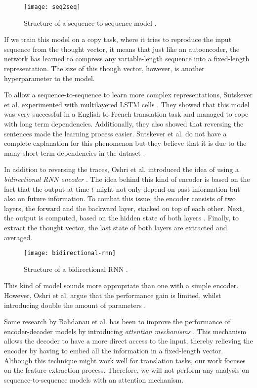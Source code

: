 \begin{figure}[ht]
  \centering
  \texttt{[image: seq2seq]}
  \caption{Structure of a sequence-to-sequence model \cite{britz_2016_1}.}
  \label{fig:seq2seq}
\end{figure}

If we train this model on a copy task, where it tries to reproduce the input sequence from the thought vector, it means that just like an autoencoder,
the network has learned to compress any variable-length sequence into a fixed-length representation.
The size of this though vector, however, is another hyperparameter to the model.

To allow a sequence-to-sequence to learn more complex representations, Sutskever et al. experimented with multilayered LSTM cells \cite{sutskever_vinyals_le}.
They showed that this model was very successful in a English to French translation task and managed to cope with long term dependencies.
Additionally, they also showed that reversing the sentences made the learning process easier.
Sutskever et al. do not have a complete explanation for this phenomenon but they believe that it is due to the many short-term dependencies in the dataset \cite{sutskever_vinyals_le}.

In addition to reversing the traces, Oshri et al. introduced the idea of using a \textit{bidirectional RNN encoder} \cite{rnnencoder}.
The idea behind this kind of encoder is based on the fact that the output at time $t$ might not only depend on past information but also on future information.
To combat this issue, the encoder consists of two layers, the forward and the backward layer, stacked on top of each other.
Next, the output is computed, based on the hidden state of both layers \cite{britz_2016}.
Finally, to extract the thought vector, the last state of both layers are extracted and averaged.

\begin{figure}[ht]
  \centering
  \texttt{[image: bidirectional-rnn]}
  \caption{Structure of a bidirectional RNN \cite{britz_2016}.}
  \label{fig:bidirectional-rnn}
\end{figure}

This kind of model sounds more appropriate than one with a simple encoder.
However, Oshri et al. argue that the performance gain is limited, whilst introducing double the amount of parameters \cite{rnnencoder}.

Some research by Bahdanau et al. has been to improve the performance of encoder-decoder models by introducing \textit{attention mechanisms} \cite{attention_mechanisms}.
This mechanism allows the decoder to have a more direct access to the input, thereby relieving the encoder by having to embed all the information in a fixed-length vector.
Although this technique might work well for translation tasks, our work focuses on the feature extraction process.
Therefore, we will not perform any analysis on sequence-to-sequence models with an attention mechanism.

